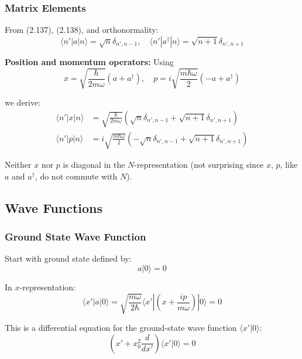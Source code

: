 \documentclass[11pt,a4paper]{article}
\begin{document}
\subsubsection{Matrix Elements}

From (2.137), (2.138), and orthonormality:
\begin{equation}
\langle n'|a|n\rangle = \sqrt{n}\delta_{n',n-1}, \quad \langle n'|a^\dagger|n\rangle = \sqrt{n+1}\delta_{n',n+1}
\tag{2.144}
\end{equation}

\textbf{Position and momentum operators:}
Using
\begin{equation}
x = \sqrt{\frac{\hbar}{2m\omega}}(a + a^\dagger), \quad p = i\sqrt{\frac{m\hbar\omega}{2}}(-a + a^\dagger)
\tag{2.145}
\end{equation}

we derive:
\begin{align}
\langle n'|x|n\rangle &= \sqrt{\frac{\hbar}{2m\omega}}(\sqrt{n}\delta_{n',n-1} + \sqrt{n+1}\delta_{n',n+1}) \tag{2.146a} \\
\langle n'|p|n\rangle &= i\sqrt{\frac{m\hbar\omega}{2}}(-\sqrt{n}\delta_{n',n-1} + \sqrt{n+1}\delta_{n',n+1}) \tag{2.146b}
\end{align}

Neither $x$ nor $p$ is diagonal in the $N$-representation (not surprising since $x$, $p$, like $a$ and $a^\dagger$, do not commute with $N$).

\subsection{Wave Functions}

\subsubsection{Ground State Wave Function}

Start with ground state defined by:
\begin{equation}
a|0\rangle = 0
\tag{2.147}
\end{equation}

In $x$-representation:
\begin{equation}
\langle x'|a|0\rangle = \sqrt{\frac{m\omega}{2\hbar}}\langle x'|\left(x + \frac{ip}{m\omega}\right)|0\rangle = 0
\tag{2.148}
\end{equation}

This is a differential equation for the ground-state wave function $\langle x'|0\rangle$:
\begin{equation}
\left(x' + x_0^2\frac{d}{dx'}\right)\langle x'|0\rangle = 0
\tag{2.149}
\end{equation}
\end{document}

